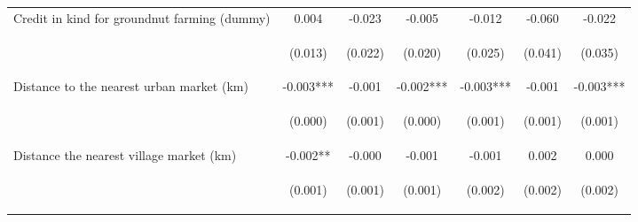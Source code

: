 \begin{center}
\begin{tabular}{lcccccc}
Credit in kind for groundnut farming (dummy) & 0.004 & -0.023 & -0.005 & -0.012 & -0.060 & -0.022 \\
\vspace{4pt} & \begin{footnotesize}(0.013)\end{footnotesize} & \begin{footnotesize}(0.022)\end{footnotesize} & \begin{footnotesize}(0.020)\end{footnotesize} & \begin{footnotesize}(0.025)\end{footnotesize} & \begin{footnotesize}(0.041)\end{footnotesize} & \begin{footnotesize}(0.035)\end{footnotesize} \\
Distance to the nearest urban market (km) & -0.003*** & -0.001 & -0.002*** & -0.003*** & -0.001 & -0.003*** \\
\vspace{4pt} & \begin{footnotesize}(0.000)\end{footnotesize} & \begin{footnotesize}(0.001)\end{footnotesize} & \begin{footnotesize}(0.000)\end{footnotesize} & \begin{footnotesize}(0.001)\end{footnotesize} & \begin{footnotesize}(0.001)\end{footnotesize} & \begin{footnotesize}(0.001)\end{footnotesize} \\
Distance the nearest village market (km) & -0.002** & -0.000 & -0.001 & -0.001 & 0.002 & 0.000 \\
\vspace{4pt} & \begin{footnotesize}(0.001)\end{footnotesize} & \begin{footnotesize}(0.001)\end{footnotesize} & \begin{footnotesize}(0.001)\end{footnotesize} & \begin{footnotesize}(0.002)\end{footnotesize} & \begin{footnotesize}(0.002)\end{footnotesize} & \begin{footnotesize}(0.002)\end{footnotesize} \\

\end{tabular}
\end{center}
